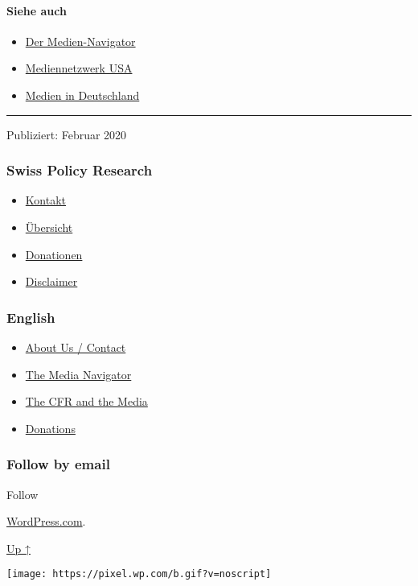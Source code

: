 \hypertarget{siehe-auch}{%
\paragraph{Siehe auch}\label{siehe-auch}}

\begin{itemize}
\tightlist
\item
  \href{https://swprs.org/medien-navigator/}{Der Medien-Navigator}
\item
  \href{https://swprs.org/das-american-empire-und-seine-medien/}{Mediennetzwerk
  USA}
\item
  \href{https://swprs.org/netzwerk-medien-deutschland/}{Medien in
  Deutschland}
\end{itemize}

\begin{center}\rule{0.5\linewidth}{\linethickness}\end{center}

Publiziert: Februar 2020

\hypertarget{swiss-policy-research}{%
\subsubsection{Swiss Policy Research}\label{swiss-policy-research}}

\begin{itemize}
\tightlist
\item
  \href{https://swprs.org/kontakt/}{Kontakt}
\item
  \href{https://swprs.org/uebersicht/}{Übersicht}
\item
  \href{https://swprs.org/donationen/}{Donationen}
\item
  \href{https://swprs.org/disclaimer/}{Disclaimer}
\end{itemize}

\hypertarget{english}{%
\subsubsection{English}\label{english}}

\begin{itemize}
\tightlist
\item
  \href{https://swprs.org/contact/}{About Us / Contact}
\item
  \href{https://swprs.org/media-navigator/}{The Media Navigator}
\item
  \href{https://swprs.org/the-american-empire-and-its-media/}{The CFR
  and the Media}
\item
  \href{https://swprs.org/donations/}{Donations}
\end{itemize}

\hypertarget{follow-by-email}{%
\subsubsection{Follow by email}\label{follow-by-email}}

Follow

\href{https://wordpress.com/?ref=footer_custom_com}{WordPress.com}.

\protect\hyperlink{}{Up ↑}

\texttt{[image: https://pixel.wp.com/b.gif?v=noscript]}
